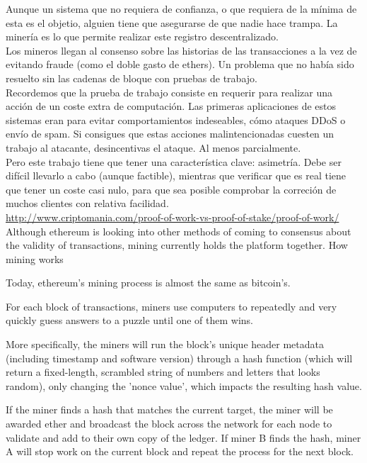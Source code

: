 \documentclass[11pt,a4paper]{article}
\begin{document}
Aunque un sistema que no requiera de confianza, o que requiera de la mínima de esta es el objetio, alguien tiene que asegurarse de que nadie hace trampa. La minería es lo que permite realizar este registro descentralizado. \\

Los mineros llegan al consenso sobre las historias de las transacciones a la vez de evitando fraude (como el doble gasto de ethers). Un problema que no había sido resuelto sin las cadenas de bloque con pruebas de trabajo.\\

Recordemos que la prueba de trabajo consiste en requerir para realizar una acción de un coste extra de computación. Las primeras aplicaciones de estos sistemas eran para evitar comportamientos indeseables, cómo ataques DDoS o envío de spam. Si consigues que estas acciones malintencionadas cuesten un trabajo al atacante, desincentivas el ataque. Al menos parcialmente.\\

Pero este trabajo tiene que tener una característica clave: asimetría. Debe ser difícil llevarlo a cabo (aunque factible), mientras que verificar que es real tiene que tener un coste casi nulo, para que sea posible comprobar la correción de muchos clientes con relativa facilidad.\\

\url{http://www.criptomania.com/proof-of-work-vs-proof-of-stake/proof-of-work/}\\


Although ethereum is looking into other methods of coming to consensus about the validity of transactions, mining currently holds the platform together.
How mining works

Today, ethereum's mining process is almost the same as bitcoin’s.

For each block of transactions, miners use computers to repeatedly and very quickly guess answers to a puzzle until one of them wins.

More specifically, the miners will run the block’s unique header metadata (including timestamp and software version) through a hash function (which will return a fixed-length, scrambled string of numbers and letters that looks random), only changing the 'nonce value', which impacts the resulting hash value.

If the miner finds a hash that matches the current target, the miner will be awarded ether and broadcast the block across the network for each node to validate and add to their own copy of the ledger. If miner B finds the hash, miner A will stop work on the current block and repeat the process for the next block.
\end{document}
